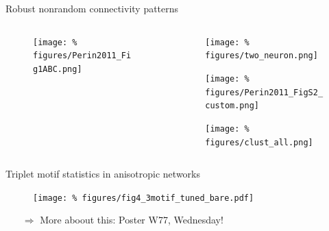 \begin{frame}{Robust nonrandom connectivity patterns}
  \begin{columns}
    \begin{column}{.45\textwidth}
      \minipage[c][0.75\textheight][s]{\columnwidth}
      
      \begin{figure}
        \centering
        \texttt{[image: \%
          figures/Perin2011\_Fig1ABC.png]} %
      \end{figure}
      

      
      \endminipage      
    \end{column}
    \begin{column}{.55\textwidth}


      \vspace{-0.2cm}
      
      \begin{figure}
        \centering
        \texttt{[image: \%
          figures/two\_neuron.png]} %
      \end{figure}

      \vfill
      

      \begin{figure}
        \centering
        \texttt{[image: \%
        figures/Perin2011\_FigS2\_custom.png]} %
      \end{figure}

      \vfill
      

      \begin{figure}
        \centering
        \texttt{[image: \%
          figures/clust\_all.png]} %
      \end{figure}
      
      \vfill

      
    \end{column}
  \end{columns}


  
\end{frame}


\begin{frame}{Triplet motif statistics in anisotropic networks}
  
  \begin{figure}
    \centering
    \texttt{[image: \%
      figures/fig4\_3motif\_tuned\_bare.pdf]} %
  \end{figure}

\vspace{0.9cm}
  
\begin{itemize}[leftmargin=2cm]

  \Large
  
  \item[$\Rightarrow$] More aboout this: Poster W77, Wednesday!
  
  
\end{itemize}

  
\end{frame}
